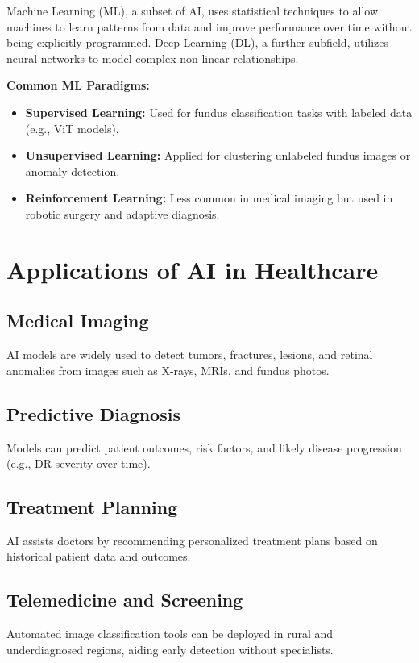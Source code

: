\documentclass[a4paper,12pt]{report}
\begin{document}
Machine Learning (ML), a subset of AI, uses statistical techniques to allow machines to learn patterns from data and improve performance over time without being explicitly programmed. Deep Learning (DL), a further subfield, utilizes neural networks to model complex non-linear relationships.

\textbf{Common ML Paradigms:}
\begin{itemize}
    \item \textbf{Supervised Learning:} Used for fundus classification tasks with labeled data (e.g., ViT models).
    \item \textbf{Unsupervised Learning:} Applied for clustering unlabeled fundus images or anomaly detection.
    \item \textbf{Reinforcement Learning:} Less common in medical imaging but used in robotic surgery and adaptive diagnosis.
\end{itemize}

\section{Applications of AI in Healthcare}

\subsection{Medical Imaging}
AI models are widely used to detect tumors, fractures, lesions, and retinal anomalies from images such as X-rays, MRIs, and fundus photos.

\subsection{Predictive Diagnosis}
Models can predict patient outcomes, risk factors, and likely disease progression (e.g., DR severity over time).

\subsection{Treatment Planning}
AI assists doctors by recommending personalized treatment plans based on historical patient data and outcomes.

\subsection{Telemedicine and Screening}
Automated image classification tools can be deployed in rural and underdiagnosed regions, aiding early detection without specialists.
\end{document}
